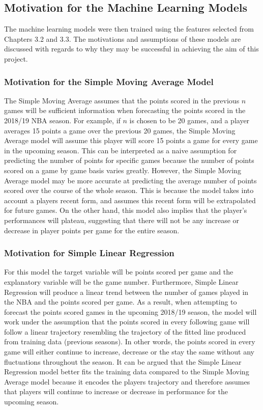 \documentclass[a4paper,11pt,twoside]{article}
\begin{document}
\subsection{Motivation for the Machine Learning Models} 

The machine learning models were then trained using the features selected from Chapters 3.2 and 3.3. The motivations and assumptions of these models are discussed with regards to why they may be successful in achieving the aim of this project.

\subsubsection{Motivation for the Simple Moving Average Model}

The Simple Moving Average assumes that the points scored in the previous $n$ games will be sufficient information when forecasting the points scored in the 2018/19 NBA season. For example, if $n$ is chosen to be 20 games, and a player averages 15 points a game over the previous 20 games, the Simple Moving Average model will assume this player will score 15 points a game for every game in the upcoming season. This can be interpreted as a naive assumption for predicting the number of points for specific games because the number of points scored on a game by game basis varies greatly. However, the Simple Moving Average model may be more accurate at predicting the average number of points scored over the course of the whole season. This is because the model takes into account a players recent form, and assumes this recent form will be extrapolated for future games. On the other hand, this model also implies that the player's performances will plateau, suggesting that there will not be any increase or decrease in player points per game for the entire season. 


\subsubsection{Motivation for Simple Linear Regression}

For this model the target variable will be points scored per game and the explanatory variable will be the game number. Furthermore, Simple Linear Regression will produce a linear trend between the number of games played in the NBA and the points scored per game. As a result, when attempting to forecast the points scored games in the upcoming 2018/19 season, the model will work under the assumption that the points scored in every following game will follow a linear trajectory resembling the trajectory of the fitted line produced from training data (previous seasons). In other words, the points scored in every game will either continue to increase, decrease or the stay the same without any fluctuations throughout the season. It can be argued that the Simple Linear Regression model better fits the training data compared to the Simple Moving Average model because it encodes the players trajectory and therefore assumes that players will continue to increase or decrease in performance for the upcoming season.
\end{document}
